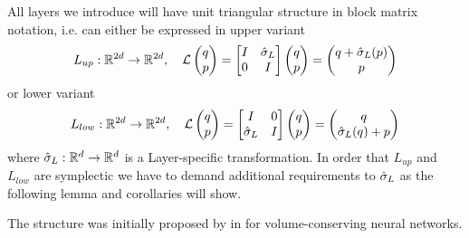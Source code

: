 \documentclass[twoside,a4paper]{article}
\begin{document}
All layers we introduce will have unit triangular structure in block matrix notation, 
i.e. can either be expressed in upper variant
\begin{equation*}
	L_{up} : \mathbb{R}^{2d} \to \mathbb{R}^{2d},
	\quad \mathcal{L} \begin{pmatrix} q \\ p \end{pmatrix} = \begin{bmatrix} I & {\hat{\sigma}_L} \\ 0 & I \end{bmatrix} \begin{pmatrix} q \\ p \end{pmatrix}
	= \begin{pmatrix}
		q + \hat{\sigma}_L(p) \\
		p
	\end{pmatrix}
\end{equation*}
or lower variant
\begin{equation*}
	L_{low} : \mathbb{R}^{2d} \to \mathbb{R}^{2d},
	\quad \mathcal{L} \begin{pmatrix} q \\ p \end{pmatrix} = \begin{bmatrix} I & 0 \\ {\hat{\sigma}_L} & I \end{bmatrix} \begin{pmatrix} q \\ p \end{pmatrix}
	= \begin{pmatrix}
		q \\
		\hat{\sigma}_L(q) + p
	\end{pmatrix}
\end{equation*}
where $\hat{\sigma}_L : \mathbb{R}^d \to \mathbb{R}^d$ is a Layer-specific transformation.
In order that $L_{up}$ and $L_{low}$ are symplectic we have to demand additional requirements
to $\hat{\sigma}_L$ as the following lemma and corollaries will show.

The structure was initially proposed by \citeauthor{Deco1995} in \cite{Deco1995} 
 for volume-conserving neural networks.

\end{document}
